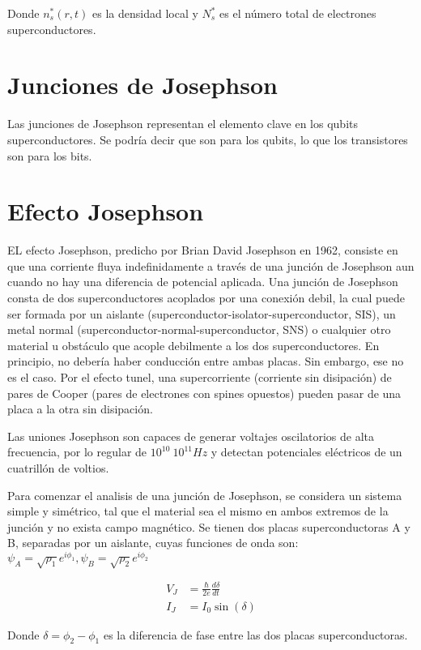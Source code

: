 Donde $n^*_s(r,t)$ es la densidad local y $N^*_s$ es el número total de electrones superconductores.

\section{Junciones de Josephson}

Las junciones de Josephson representan el elemento clave en los qubits superconductores. Se podría decir que son para los qubits, lo que los transistores son para los bits.

\section{Efecto Josephson}

EL efecto Josephson, predicho por Brian David Josephson en 1962, consiste en que una corriente fluya indefinidamente a través de una junción de Josephson aun cuando no hay una diferencia de potencial aplicada. Una junción de Josephson consta de dos superconductores acoplados por una conexión debil, la cual puede ser formada por un aislante (superconductor-isolator-superconductor, SIS), un metal normal (superconductor-normal-superconductor, SNS) o cualquier otro material u obstáculo que acople debilmente a los dos superconductores. En principio, no debería haber conducción entre ambas placas.  Sin embargo, ese no es el caso. Por el efecto tunel, una supercorriente (corriente sin disipación) de pares de Cooper (pares de electrones con spines opuestos) pueden pasar de una placa a la otra sin disipación.

Las uniones Josephson son capaces de generar voltajes oscilatorios de alta frecuencia, por lo regular de $10^{10} ~ 10^{11} Hz$ y detectan potenciales eléctricos de un cuatrillón de voltios.

Para comenzar el analisis de una junción de Josephson, se considera un sistema simple y simétrico, tal que el material sea el mismo en ambos extremos de la junción y no exista campo magnético. Se tienen dos placas superconductoras A y B, separadas por un aislante, cuyas funciones de onda son: $\psi_A = \sqrt{\rho_1} e^{i \phi_1}, \psi_B = \sqrt{\rho_2} e^{i \phi_2}$ 


\begin{align}
    V_J &= \frac{\hbar}{2e} \frac{d\delta}{dt} \\
    I_J &= I_0 \sin(\delta)
\end{align}

Donde $\delta=\phi_2-\phi_1$ es la diferencia de fase entre las dos placas superconductoras.

